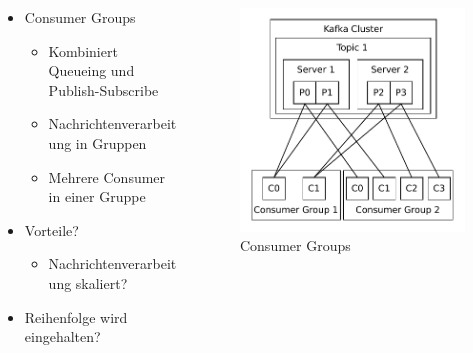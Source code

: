 \begin{frame}
\begin{columns}[T] %
	\begin{column}[T]{.65\textwidth} 
		\begin{itemize}
			\item Consumer Groups
			\begin{itemize}
				\item Kombiniert Queueing und Publish-Subscribe
				\item Nachrichtenverarbeitung in Gruppen
				\item Mehrere Consumer in einer Gruppe
			\end{itemize}
			\item Vorteile?
			\begin{itemize}
				\item Nachrichtenverarbeitung skaliert? %
			\end{itemize}
			\item Reihenfolge wird eingehalten?
		\end{itemize}
	\end{column}
	\begin{column}[T]{.35\textwidth}
		\begin{figure}
		\centering
		\includegraphics[scale=0.5]{figure/consumer_groups.pdf}
		\caption{Consumer Groups~\cite{Kafka}}
		\end{figure}
	\end{column}
\end{columns}



\end{frame}

